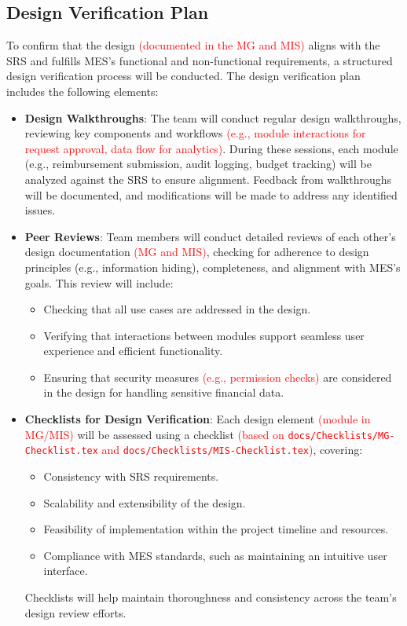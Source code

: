 \documentclass[12pt, titlepage]{article}
\begin{document}
\subsection{Design Verification Plan}
To confirm that the design \textcolor{red}{(documented in the MG and MIS)} aligns with the SRS and fulfills MES’s functional and non-functional requirements, a structured design verification process will be conducted. The design verification plan includes the following elements:

\begin{itemize}
    \item \textbf{Design Walkthroughs}: The team will conduct regular design walkthroughs, reviewing key components and workflows \textcolor{red}{(e.g., module interactions for request approval, data flow for analytics)}. During these sessions, each module (e.g., reimbursement submission, audit logging, budget tracking) will be analyzed against the SRS to ensure alignment. Feedback from walkthroughs will be documented, and modifications will be made to address any identified issues.

    \item \textbf{Peer Reviews}: Team members will conduct detailed reviews of each other’s design documentation \textcolor{red}{(MG and MIS)}, checking for adherence to design principles (e.g., information hiding), completeness, and alignment with MES’s goals. This review will include:
    \begin{itemize}
        \item Checking that all use cases are addressed in the design.
        \item Verifying that interactions between modules support seamless user experience and efficient functionality.
        \item Ensuring that security measures \textcolor{red}{(e.g., permission checks)} are considered in the design for handling sensitive financial data.
    \end{itemize}

    \item \textbf{Checklists for Design Verification}: Each design element \textcolor{red}{(module in MG/MIS)} will be assessed using a checklist \textcolor{red}{(based on \texttt{docs/Checklists/MG-Checklist.tex} and \texttt{docs/Checklists/MIS-Checklist.tex})}, covering:
    \begin{itemize}
        \item Consistency with SRS requirements.
        \item Scalability and extensibility of the design.
        \item Feasibility of implementation within the project timeline and resources.
        \item Compliance with MES standards, such as maintaining an intuitive user interface.
    \end{itemize}
    Checklists will help maintain thoroughness and consistency across the team’s design review efforts.


\end{itemize}
\end{document}
